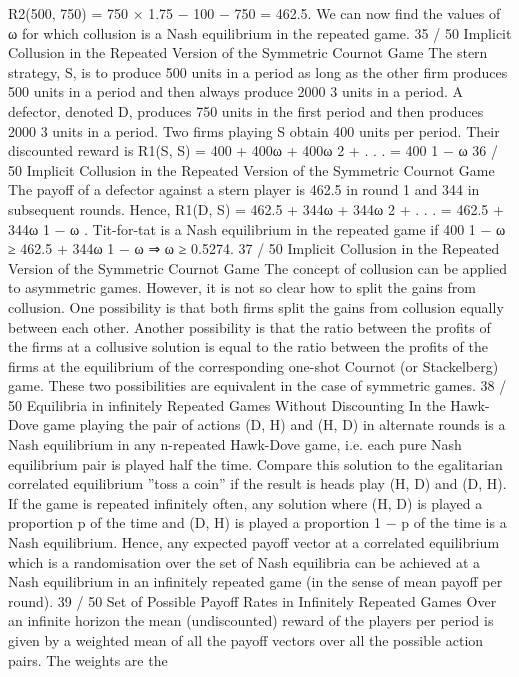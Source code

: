 R2(500, 750) = 750 × 1.75 − 100 − 750 = 462.5.
We can now find the values of ω for which collusion is a Nash
equilibrium in the repeated game.
35 / 50
Implicit Collusion in the Repeated Version of the
Symmetric Cournot Game
The stern strategy, S, is to produce 500 units in a period as long
as the other firm produces 500 units in a period and then always
produce 2000
3
units in a period.
A defector, denoted D, produces 750 units in the first period and
then produces 2000
3
units in a period.
Two firms playing S obtain 400 units per period. Their discounted
reward is
R1(S, S) = 400 + 400ω + 400ω
2 + . . . =
400
1 − ω
36 / 50
Implicit Collusion in the Repeated Version of the
Symmetric Cournot Game
The payoff of a defector against a stern player is 462.5 in round 1
and 344 in subsequent rounds. Hence,
R1(D, S) = 462.5 + 344ω + 344ω
2 + . . . = 462.5 +
344ω
1 − ω
.
Tit-for-tat is a Nash equilibrium in the repeated game if
400
1 − ω
≥ 462.5 +
344ω
1 − ω
⇒ ω ≥ 0.5274.
37 / 50
Implicit Collusion in the Repeated Version of the
Symmetric Cournot Game
The concept of collusion can be applied to asymmetric games.
However, it is not so clear how to split the gains from collusion.
One possibility is that both firms split the gains from collusion
equally between each other.
Another possibility is that the ratio between the profits of the firms
at a collusive solution is equal to the ratio between the profits of
the firms at the equilibrium of the corresponding one-shot Cournot
(or Stackelberg) game.
These two possibilities are equivalent in the case of symmetric
games.
38 / 50
Equilibria in infinitely Repeated Games Without
Discounting
In the Hawk-Dove game playing the pair of actions (D, H) and
(H, D) in alternate rounds is a Nash equilibrium in any n-repeated
Hawk-Dove game, i.e. each pure Nash equilibrium pair is played
half the time.
Compare this solution to the egalitarian correlated equilibrium
”toss a coin” if the result is heads play (H, D) and (D, H).
If the game is repeated infinitely often, any solution where (H, D)
is played a proportion p of the time and (D, H) is played a
proportion 1 − p of the time is a Nash equilibrium.
Hence, any expected payoff vector at a correlated equilibrium
which is a randomisation over the set of Nash equilibria can be
achieved at a Nash equilibrium in an infinitely repeated game (in
the sense of mean payoff per round).
39 / 50
Set of Possible Payoff Rates in Infinitely Repeated Games
Over an infinite horizon the mean (undiscounted) reward of the
players per period is given by a weighted mean of all the payoff
vectors over all the possible action pairs. The weights are the
